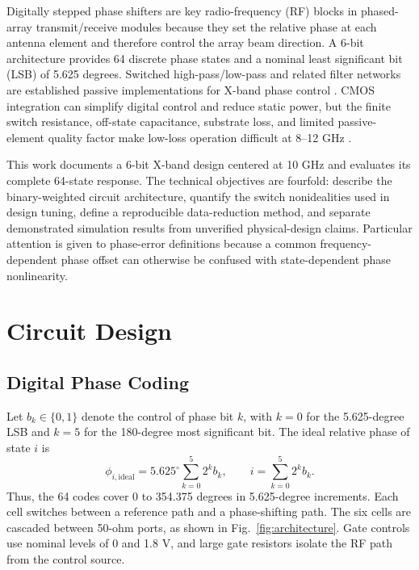 \documentclass[conference]{IEEEtran}
\begin{document}
Digitally stepped phase shifters are key radio-frequency (RF) blocks in
phased-array transmit/receive modules because they set the relative phase at
each antenna element and therefore control the array beam direction. A
6-bit architecture provides 64 discrete phase states and a nominal least
significant bit (LSB) of 5.625 degrees. Switched high-pass/low-pass and
related filter networks are established passive implementations for X-band
phase control \cite{wang2015,xiong2017}. CMOS integration can simplify
digital control and reduce static power, but the finite switch resistance,
off-state capacitance, substrate loss, and limited passive-element quality
factor make low-loss operation difficult at 8--12 GHz
\cite{alsuraisry2015,kang2009}.

This work documents a 6-bit X-band design centered at 10 GHz and evaluates
its complete 64-state response. The technical objectives are fourfold:
describe the binary-weighted circuit architecture, quantify the switch
nonidealities used in design tuning, define a reproducible data-reduction
method, and separate demonstrated simulation results from unverified
physical-design claims. Particular attention is given to phase-error
definitions because a common frequency-dependent phase offset can otherwise
be confused with state-dependent phase nonlinearity.

\section{Circuit Design}

\subsection{Digital Phase Coding}

Let $b_k\in\{0,1\}$ denote the control of phase bit $k$, with $k=0$ for the
5.625-degree LSB and $k=5$ for the 180-degree most significant bit. The ideal
relative phase of state $i$ is
\begin{equation}
  \phi_{i,\mathrm{ideal}}
  = 5.625^\circ\sum_{k=0}^{5} 2^k b_k,
  \qquad i=\sum_{k=0}^{5}2^k b_k .
  \label{eq:phase_code}
\end{equation}
Thus, the 64 codes cover 0 to 354.375 degrees in 5.625-degree increments.
Each cell switches between a reference path and a phase-shifting path. The
six cells are cascaded between 50-ohm ports, as shown in
Fig.~\ref{fig:architecture}. Gate controls use nominal levels of 0 and 1.8 V,
and large gate resistors isolate the RF path from the control source.
\end{document}
